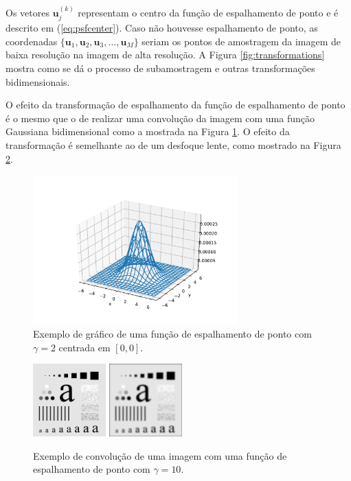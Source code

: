 Os vetores $\mathbf{u}^{(k)}_j$ representam o centro da função de espalhamento de ponto e é descrito em (\ref{eq:psfcenter}).
Caso não houvesse espalhamento de ponto, as coordenadas $\{\mathbf{u}_1, \mathbf{u}_2,\mathbf{u}_3,..., \mathbf{u}_M\}$ seriam os pontos de amostragem da imagem de baixa resolução na imagem de alta resolução.
A Figura \ref{fig:transformations} mostra como se dá o processo de subamostragem e outras transformações bidimensionais.

O efeito da transformação de espalhamento da função de espalhamento de ponto é o mesmo que o de realizar uma convolução da imagem com uma função Gaussiana bidimensional como a mostrada na Figura \ref{fig:psfplot}.
O efeito da transformação é semelhante ao de um desfoque lente, como mostrado na Figura \ref{fig:psfexample}.


\begin{figure}[h]
	\centering
	\includegraphics[width = 0.7\textwidth]{./figures/psf1.pdf}
	\caption{Exemplo de gráfico de uma função de espalhamento de ponto com $\gamma = 2$ centrada em $[0,0]$.}
	\label{fig:psfplot}
\end{figure}

\begin{figure}
	\centering
	\includegraphics[width = 0.25\textwidth]{./figures/psfexample0.png}
	\includegraphics[width = 0.25\textwidth]{./figures/psfexample1.png}
	\caption{Exemplo de convolução de uma imagem com uma função de espalhamento de ponto com $\gamma = 10$.}
	\label{fig:psfexample}
\end{figure}

